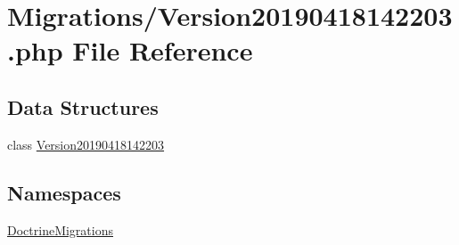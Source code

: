 \hypertarget{_version20190418142203_8php}{}\section{Migrations/\+Version20190418142203.php File Reference}
\label{_version20190418142203_8php}
\subsection*{Data Structures}
\begin{DoxyCompactItemize}
\item 
class \mbox{\hyperlink{class_doctrine_migrations_1_1_version20190418142203}{Version20190418142203}}
\end{DoxyCompactItemize}
\subsection*{Namespaces}
\begin{DoxyCompactItemize}
\item 
 \mbox{\hyperlink{namespace_doctrine_migrations}{Doctrine\+Migrations}}
\end{DoxyCompactItemize}
